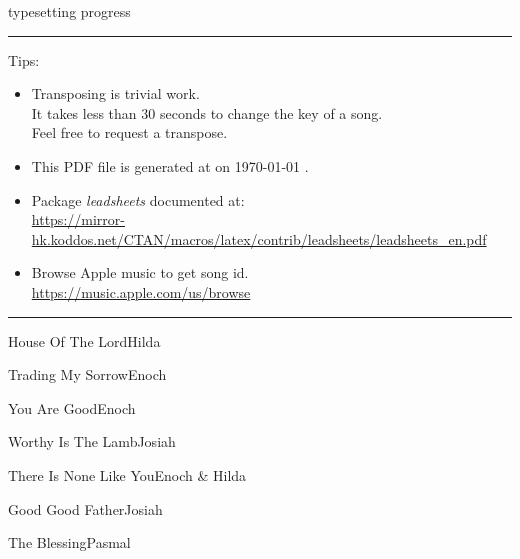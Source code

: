 \documentclass{article}
\begin{document}


\par
{\ttfamily typesetting progress} \par
\bigskip

\label{lbtoc}
\newcommand{\cursec}[0]{}
\tableofcontents
\bigskip
\hrule
\bigskip
Tips:
\begin{itemize}
  \item Transposing is trivial work. \\ It takes less than 30 seconds to change the key of a song. \\ Feel free to request a transpose.
  \item This PDF file is generated at \textbraceleft{} \currenttime{} \textbraceright{} on \textbraceleft{} \today{} \textbraceright{}.
  \item Package \textit{leadsheets} documented at: \\ \url{https://mirror-hk.koddos.net/CTAN/macros/latex/contrib/leadsheets/leadsheets_en.pdf}
  \item Browse Apple music to get song id. \\ \url{https://music.apple.com/us/browse}
\end{itemize}
\hrule
\pagebreak

{}{}{}{}{House Of The Lord}{}{Hilda}{}

{}{}{}{}{Trading My Sorrow}{}{Enoch}{}

{}{}{}{}{You Are Good}{}{Enoch}{}




{}{}{}{}{Worthy Is The Lamb}{}{Josiah}{}

{}{}{}{}{There Is None Like You}{}{Enoch \& Hilda}{}


{}{}{}{}{Good Good Father}{}{Josiah}{}

{}{}{}{}{The Blessing}{}{Pasmal}{}
\end{document}
